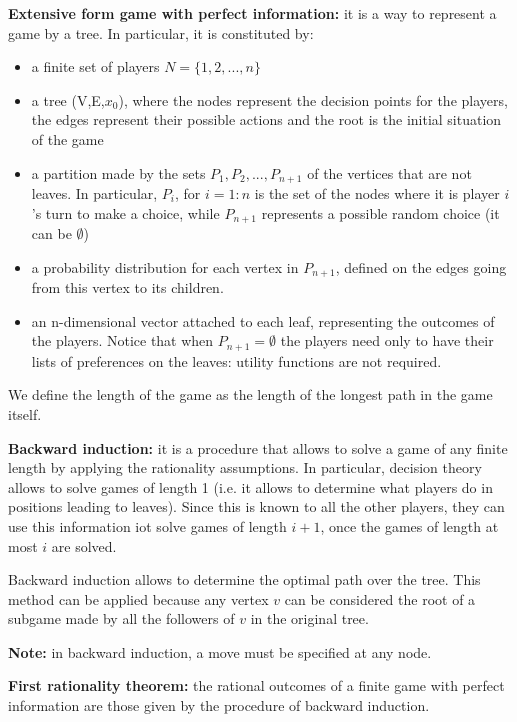 \bigskip
\noindent \textbf{Extensive form game with perfect information:} it is a way to 
represent a game by a tree. In particular, it is constituted by:
\begin{itemize}
	\item a finite set of players $N = \{1,2,...,n\}$
	\item a tree (V,E,$x_0$), where the nodes represent the decision points for 
	the players, the edges represent their possible actions and the root is the 
	initial situation of the game
	\item a partition made by the sets $P_1,P_2,...,P_{n+1}$ of the vertices 
	that are not leaves. In particular, $P_i$, for $i=1:n$ is the set of the 
	nodes where it is player $i$'s turn to make a choice, while $P_{n+1}$ 
	represents a possible random choice (it can be $\emptyset$)
	\item a probability distribution for each vertex in $P_{n+1}$, defined on 
	the edges going from this vertex to its children.
	\item an n-dimensional vector attached to each leaf, representing the 
	outcomes of the players. Notice that when $P_{n+1}=\emptyset$ the players 
	need only to have their lists of preferences on the leaves: utility 
	functions are not required.
\end{itemize}
We define the length of the game as the length of the longest path in the game 
itself.

\bigskip
\noindent \textbf{Backward induction:} it is a procedure that allows to solve 
a game of any finite length by applying the rationality assumptions. In 
particular, decision theory allows to solve games of length 1 (i.e. it allows 
to determine what players do in positions leading to leaves). Since this is 
known to all the other players, they can use this information iot solve games 
of length $i+1$, once the games of length at most $i$ are solved.

\noindent Backward induction allows to determine the optimal path over the tree. 
This method can be applied because any vertex $v$ can be considered the root of 
a subgame made by all the followers of $v$ in the original tree.

\noindent \textbf{Note:} in backward induction, a move must be specified at any 
node.

\bigskip
\noindent \textbf{First rationality theorem:} the rational outcomes of a finite 
game with perfect information are those given by the procedure of backward 
induction.

